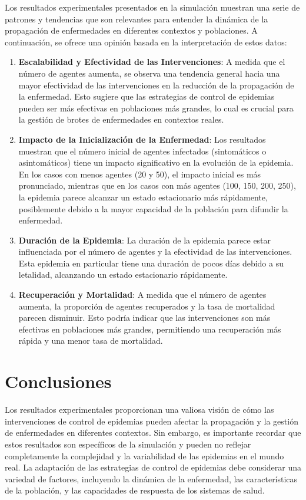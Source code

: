 Los resultados experimentales presentados en la simulación muestran una serie de patrones y tendencias que son relevantes para entender la dinámica de la propagación de enfermedades en diferentes contextos y poblaciones. A continuación, se ofrece una opinión basada en la interpretación de estos datos:
\begin{enumerate}
\item \textbf{Escalabilidad y Efectividad de las Intervenciones}: A medida que el número de agentes aumenta, se observa una tendencia general hacia una mayor efectividad de las intervenciones en la reducción de la propagación de la enfermedad. Esto sugiere que las estrategias de control de epidemias pueden ser más efectivas en poblaciones más grandes, lo cual es crucial para la gestión de brotes de enfermedades en contextos reales.
\item \textbf{Impacto de la Inicialización de la Enfermedad}: Los resultados muestran que el número inicial de agentes infectados (sintomáticos o asintomáticos) tiene un impacto significativo en la evolución de la epidemia. En los casos con menos agentes (20 y 50), el impacto inicial es más pronunciado, mientras que en los casos con más agentes (100, 150, 200, 250), la epidemia parece alcanzar un estado estacionario más rápidamente, posiblemente debido a la mayor capacidad de la población para difundir la enfermedad.
\item \textbf{Duración de la Epidemia}: La duración de la epidemia parece estar influenciada por el número de agentes y la efectividad de las intervenciones. Esta epidemia en particular tiene una duración de pocos días debido a su letalidad, alcanzando un estado estacionario rápidamente.
\item \textbf{Recuperación y Mortalidad}: A medida que el número de agentes aumenta, la proporción de agentes recuperados y la tasa de mortalidad parecen disminuir. Esto podría indicar que las intervenciones son más efectivas en poblaciones más grandes, permitiendo una recuperación más rápida y una menor tasa de mortalidad.
\end{enumerate}

\section{Conclusiones}
Los resultados experimentales proporcionan una valiosa visión de cómo las intervenciones de control de epidemias pueden afectar la propagación y la gestión de enfermedades en diferentes contextos. Sin embargo, es importante recordar que estos resultados son específicos de la simulación y pueden no reflejar completamente la complejidad y la variabilidad de las epidemias en el mundo real. La adaptación de las estrategias de control de epidemias debe considerar una variedad de factores, incluyendo la dinámica de la enfermedad, las características de la población, y las capacidades de respuesta de los sistemas de salud.

